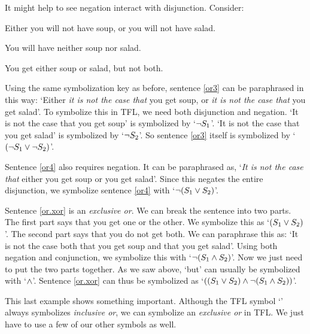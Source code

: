 It might help to see negation interact with disjunction. Consider:
	\begin{earg}
		\item[\ex{or3}] Either you will not have soup, or you will not have salad.
		\item[\ex{or4}] You will have neither soup nor salad.
		\item[\ex{or.xor}] You get either soup or salad, but not both.
	\end{earg}
Using the same symbolization key as before, sentence \ref{or3} can be paraphrased in this way: `Either \emph{it is not the case that} you get soup, or \emph{it is not the case that} you get salad'. To symbolize this in TFL, we need both disjunction and negation. `It is not the case that you get soup' is symbolized by `$\neg S_1$'. `It is not the case that you get salad' is symbolized by `$\neg S_2$'. So sentence \ref{or3} itself is symbolized by `$(\neg S_1 \vee \neg S_2)$'.

Sentence \ref{or4} also requires negation. It can be paraphrased as, `\emph{It is not the case that} either you get soup or you get salad'. Since this negates the entire disjunction, we symbolize sentence \ref{or4} with `$\neg (S_1 \vee S_2)$'.

Sentence \ref{or.xor} is an \emph{exclusive or}. We can break the sentence into two parts. The first part says that you get one or the other. We symbolize this as `$(S_1 \vee S_2)$'. The second part says that you do not get both. We can paraphrase this as: `It is not the case both that you get soup and that you get salad'. Using both negation and conjunction, we symbolize this with `$\neg(S_1 \wedge S_2)$'. Now we just need to put the two parts together. As we saw above, `but' can usually be symbolized with `$\wedge$'. Sentence \ref{or.xor} can thus be symbolized as `$((S_1 \vee S_2) \wedge \neg(S_1 \wedge S_2))$'.

This last example shows something important. Although the TFL symbol `\eor' always symbolizes \emph{inclusive or}, we can symbolize an \emph{exclusive or} in {TFL}. We just have to use a few of our other symbols as well.

